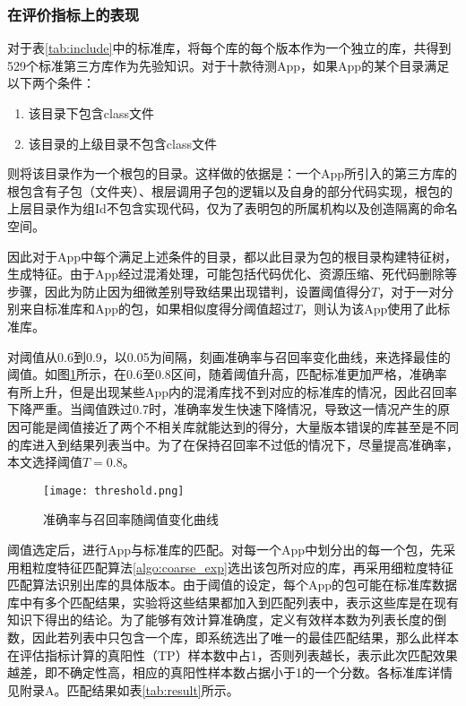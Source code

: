 \subsubsection{在评价指标上的表现}


对于表\ref{tab:include}中的标准库，将每个库的每个版本作为一个独立的库，共得到529个标准第三方库作为先验知识。对于十款待测App，如果App的某个目录满足以下两个条件：
\begin{enumerate}
\item{该目录下包含class文件}
\item{该目录的上级目录不包含class文件}
\end{enumerate}
则将该目录作为一个根包的目录。这样做的依据是：一个App所引入的第三方库的根包含有子包（文件夹）、根层调用子包的逻辑以及自身的部分代码实现，根包的上层目录作为组Id不包含实现代码，仅为了表明包的所属机构以及创造隔离的命名空间。


因此对于App中每个满足上述条件的目录，都以此目录为包的根目录构建特征树，生成特征。由于App经过混淆处理，可能包括代码优化、资源压缩、死代码删除等步骤，因此为防止因为细微差别导致结果出现错判，设置阈值得分$T$，对于一对分别来自标准库和App的包，如果相似度得分阈值超过$T$，则认为该App使用了此标准库。

对阈值从0.6到0.9，以0.05为间隔，刻画准确率与召回率变化曲线，来选择最佳的阈值。如图\ref{fig:threshold}所示，在0.6至0.8区间，随着阈值升高，匹配标准更加严格，准确率有所上升，但是出现某些App内的混淆库找不到对应的标准库的情况，因此召回率下降严重。当阈值跌过0.7时，准确率发生快速下降情况，导致这一情况产生的原因可能是阈值接近了两个不相关库就能达到的得分，大量版本错误的库甚至是不同的库进入到结果列表当中。为了在保持召回率不过低的情况下，尽量提高准确率，本文选择阈值$T=0.8$。

\begin{figure}[!htp]
  \centering
  \texttt{[image: threshold.png]} \\
  \caption{准确率与召回率随阈值变化曲线}
 \label{fig:threshold}
\end{figure}


阈值选定后，进行App与标准库的匹配。对每一个App中划分出的每一个包，先采用粗粒度特征匹配算法\ref{algo:coarse_exp}选出该包所对应的库，再采用细粒度特征匹配算法识别出库的具体版本。由于阈值的设定，每个App的包可能在标准库数据库中有多个匹配结果，实验将这些结果都加入到匹配列表中，表示这些库是在现有知识下得出的结论。为了能够有效计算准确度，定义有效样本数为列表长度的倒数，因此若列表中只包含一个库，即系统选出了唯一的最佳匹配结果，那么此样本在评估指标计算的真阳性（TP）样本数中占1，否则列表越长，表示此次匹配效果越差，即不确定性高，相应的真阳性样本数占据小于1的一个分数。各标准库详情见附录A。匹配结果如表\ref{tab:result}所示。

